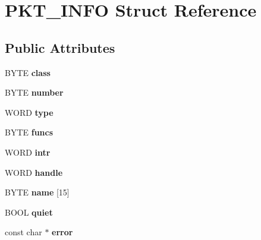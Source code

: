 \hypertarget{struct_p_k_t___i_n_f_o}{
\section{PKT\_\-INFO Struct Reference}
\label{struct_p_k_t___i_n_f_o}
}
\subsection*{Public Attributes}
\begin{DoxyCompactItemize}
\item 
\hypertarget{struct_p_k_t___i_n_f_o_ad15db95beaf1e4ce5d2637cbe28f6dc2}{
BYTE {\bfseries class}}
\label{struct_p_k_t___i_n_f_o_ad15db95beaf1e4ce5d2637cbe28f6dc2}

\item 
\hypertarget{struct_p_k_t___i_n_f_o_ae0cc68b037bf0368eb94272ed0a585dc}{
BYTE {\bfseries number}}
\label{struct_p_k_t___i_n_f_o_ae0cc68b037bf0368eb94272ed0a585dc}

\item 
\hypertarget{struct_p_k_t___i_n_f_o_a839e1bbdcb588a57fa23edc134f306fa}{
WORD {\bfseries type}}
\label{struct_p_k_t___i_n_f_o_a839e1bbdcb588a57fa23edc134f306fa}

\item 
\hypertarget{struct_p_k_t___i_n_f_o_a87df296652c8da3a5ff42e2cfd806b2e}{
BYTE {\bfseries funcs}}
\label{struct_p_k_t___i_n_f_o_a87df296652c8da3a5ff42e2cfd806b2e}

\item 
\hypertarget{struct_p_k_t___i_n_f_o_adbef6f99b039466316237ad6aea5633a}{
WORD {\bfseries intr}}
\label{struct_p_k_t___i_n_f_o_adbef6f99b039466316237ad6aea5633a}

\item 
\hypertarget{struct_p_k_t___i_n_f_o_a7fc2838ae41773498d40ffd9fe3512b8}{
WORD {\bfseries handle}}
\label{struct_p_k_t___i_n_f_o_a7fc2838ae41773498d40ffd9fe3512b8}

\item 
\hypertarget{struct_p_k_t___i_n_f_o_aee0d2f63e587d6c3eca6868d8b50c142}{
BYTE {\bfseries name} \mbox{[}15\mbox{]}}
\label{struct_p_k_t___i_n_f_o_aee0d2f63e587d6c3eca6868d8b50c142}

\item 
\hypertarget{struct_p_k_t___i_n_f_o_aafc7c292f70e875eea11be6243940359}{
BOOL {\bfseries quiet}}
\label{struct_p_k_t___i_n_f_o_aafc7c292f70e875eea11be6243940359}

\item 
\hypertarget{struct_p_k_t___i_n_f_o_ad3b8f413ea5bd1e1972973d484076baa}{
const char $\ast$ {\bfseries error}}
\label{struct_p_k_t___i_n_f_o_ad3b8f413ea5bd1e1972973d484076baa}


\end{DoxyCompactItemize}
